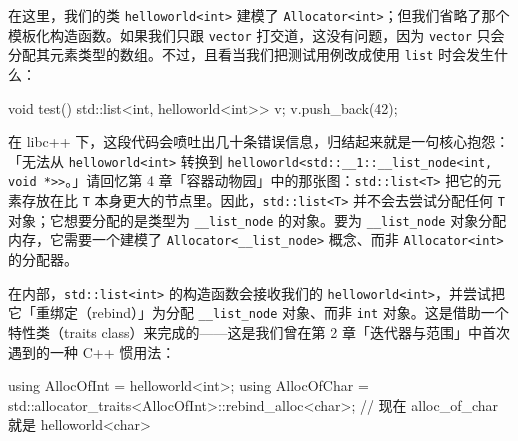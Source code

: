 在这里，我们的类 \texttt{helloworld<\allowbreak{}int>\allowbreak{}} 建模了 \texttt{Allocator<\allowbreak{}int>\allowbreak{}}；但我们省略了那个模板化构造函数。如果我们只跟 \texttt{vector} 打交道，这没有问题，因为 \texttt{vector} 只会分配其元素类型的数组。不过，且看当我们把测试用例改成使用 \texttt{list} 时会发生什么：

\begin{codebox}[cpp]
     void test() {
       std::list<int, helloworld<int>> v;
       v.push_back(42);
     }
\end{codebox}

在 libc++ 下，这段代码会喷吐出几十条错误信息，归结起来就是一句核心抱怨：「无法从 \texttt{helloworld<\allowbreak{}int>\allowbreak{}} 转换到 \texttt{helloworld<\allowbreak{}std::\allowbreak{}\_\allowbreak{}\_\allowbreak{}1::\allowbreak{}\_\allowbreak{}\_\allowbreak{}list\_\allowbreak{}node<\allowbreak{}int,\allowbreak{} void *>>}。」请回忆第 4 章「容器动物园」中的那张图：\texttt{std::\allowbreak{}list<\allowbreak{}T>\allowbreak{}} 把它的元素存放在比 \texttt{T} 本身更大的节点里。因此，\texttt{std::\allowbreak{}list<\allowbreak{}T>\allowbreak{}} 并不会去尝试分配任何 \texttt{T} 对象；它想要分配的是类型为 \texttt{\_\allowbreak{}\_\allowbreak{}list\_\allowbreak{}node} 的对象。要为 \texttt{\_\allowbreak{}\_\allowbreak{}list\_\allowbreak{}node} 对象分配内存，它需要一个建模了 \texttt{Allocator<\_\allowbreak{}\_\allowbreak{}list\_\allowbreak{}node>\allowbreak{}} 概念、而非 \texttt{Allocator<\allowbreak{}int>\allowbreak{}} 的分配器。

在内部，\texttt{std::\allowbreak{}list<\allowbreak{}int>\allowbreak{}} 的构造函数会接收我们的 \texttt{helloworld<\allowbreak{}int>\allowbreak{}}，并尝试把它「重绑定（rebind）」为分配 \texttt{\_\allowbreak{}\_\allowbreak{}list\_\allowbreak{}node} 对象、而非 \texttt{int} 对象。这是借助一个特性类（traits class）来完成的——这是我们曾在第 2 章「迭代器与范围」中首次遇到的一种 C++ 惯用法：

\begin{codebox}[cpp]
     using AllocOfInt = helloworld<int>;
     using AllocOfChar =
       std::allocator_traits<AllocOfInt>::rebind_alloc<char>;
     // 现在 alloc_of_char 就是 helloworld<char>
\end{codebox}

